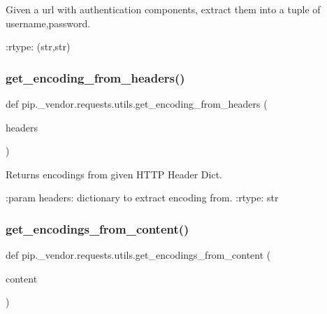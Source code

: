 \begin{DoxyVerb}Given a url with authentication components, extract them into a tuple of
username,password.

:rtype: (str,str)
\end{DoxyVerb}
 \mbox{\label{namespacepip_1_1__vendor_1_1requests_1_1utils_af1d04efb1686360ff22356a9ff956bcf}} 
\subsubsection{\texorpdfstring{get\+\_\+encoding\+\_\+from\+\_\+headers()}{get\_encoding\_from\_headers()}}
{\footnotesize\ttfamily def pip.\+\_\+vendor.\+requests.\+utils.\+get\+\_\+encoding\+\_\+from\+\_\+headers (\begin{DoxyParamCaption}\item[{}]{headers }\end{DoxyParamCaption})}

\begin{DoxyVerb}Returns encodings from given HTTP Header Dict.

:param headers: dictionary to extract encoding from.
:rtype: str
\end{DoxyVerb}
 \mbox{\label{namespacepip_1_1__vendor_1_1requests_1_1utils_a8902c8d343b5f463eae5d6e9c62bd906}} 
\subsubsection{\texorpdfstring{get\+\_\+encodings\+\_\+from\+\_\+content()}{get\_encodings\_from\_content()}}
{\footnotesize\ttfamily def pip.\+\_\+vendor.\+requests.\+utils.\+get\+\_\+encodings\+\_\+from\+\_\+content (\begin{DoxyParamCaption}\item[{}]{content }\end{DoxyParamCaption})}

